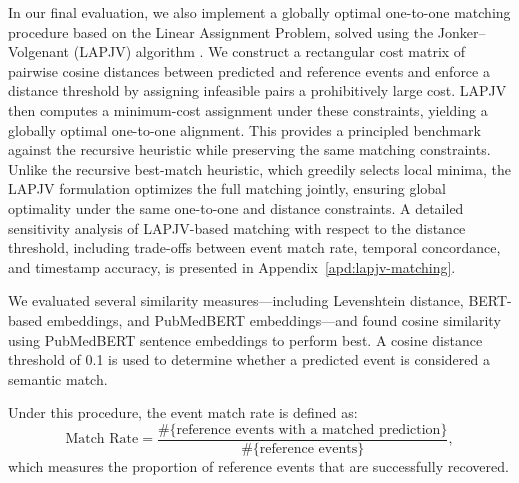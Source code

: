 In our final evaluation, we also implement a globally optimal one-to-one matching procedure based on the Linear Assignment Problem, solved using the Jonker–Volgenant (LAPJV) algorithm \citep{jonker1987shortest}. We construct a rectangular cost matrix of pairwise cosine distances between predicted and reference events and enforce a distance threshold by assigning infeasible pairs a prohibitively large cost. LAPJV then computes a minimum-cost assignment under these constraints, yielding a globally optimal one-to-one alignment. This provides a principled benchmark against the recursive heuristic while preserving the same matching constraints. Unlike the recursive best-match heuristic, which greedily selects local minima, the LAPJV formulation optimizes the full matching jointly, ensuring global optimality under the same one-to-one and distance constraints. A detailed sensitivity analysis of LAPJV-based matching with respect to the distance threshold,
including trade-offs between event match rate, temporal concordance, and timestamp accuracy, is presented in Appendix~\ref{apd:lapjv-matching}. 


We evaluated several similarity measures—including Levenshtein distance, BERT-based
embeddings, and PubMedBERT embeddings—and found cosine similarity using PubMedBERT
sentence embeddings to perform best. A cosine distance threshold of 0.1 is used to determine
whether a predicted event is considered a semantic match.

Under this procedure, the event match rate is defined as:
\[
\text{Match Rate} =
\frac{\#\{\text{reference events with a matched prediction}\}}
     {\#\{\text{reference events}\}},
\]
which measures the proportion of reference events that are successfully recovered.




